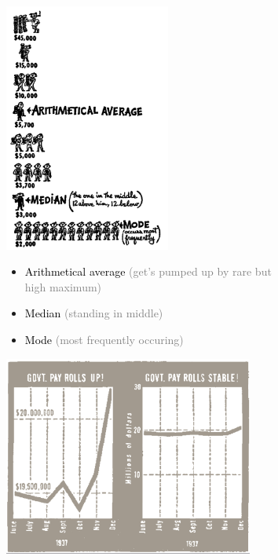 \begin{figure}[h]
  \centering
  \begin{subfigure}{0.45\textwidth}
    \centering
    \includegraphics[width=0.6\textwidth]{assets/visualization_and_extraction/lie/middle.png}
    \begin{itemize}
      \item \textcolor{black}{\small Arithmetical average} \textcolor{gray}{\footnotesize  (get's pumped up by rare but high maximum)}
      \item \textcolor{black}{\small Median} \textcolor{gray}{\footnotesize  (standing in middle)}
      \item \textcolor{black}{\small Mode} \textcolor{gray}{\footnotesize  (most frequently occuring)}
    \end{itemize}
  \end{subfigure}\hspace*{0.05\textwidth}
  \begin{subfigure}{0.45\textwidth}
    \centering
    \includegraphics[width=0.9\textwidth]{assets/visualization_and_extraction/lie/scale.png}

\end{subfigure}
\end{figure}

